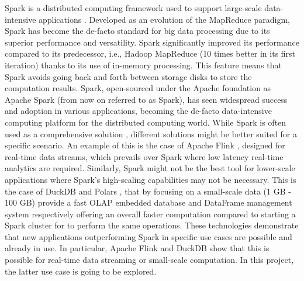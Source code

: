 Spark is a distributed computing framework used to support large-scale data-intensive applications \cite{zaharia2010spark}. Developed as an evolution of the MapReduce paradigm, Spark has become the de-facto standard for big data processing due to its superior performance and versatility. Spark significantly improved its performance compared to its predecessor, i.e., Hadoop MapReduce (10 times better in its first iteration) \cite{zaharia2010spark} thanks to its use of in-memory processing. This feature means that Spark avoids going back and forth between storage disks to store the computation results. Spark, open-sourced under the Apache foundation as Apache Spark (from now on referred to as Spark), has seen widespread success and adoption in various applications, becoming the de-facto data-intensive computing platform for the distributed computing world. While Spark is often used as a comprehensive solution \cite{zahariaApacheSparkUnified2016}, different solutions might be better suited for a specific scenario.
An example of this is the case of Apache Flink \cite{carboneApacheFlinkStream}, designed for real-time data streams, which prevails over Spark where low latency real-time analytics are required. Similarly, Spark might not be the best tool for lower-scale applications where Spark's high-scaling capabilities may not be necessary. This is the case of DuckDB \cite{raasveldtDuckDBEmbeddableAnalytical2019} and Polars \cite{vinkWroteOneFastest2021}, that by focusing on a small-scale data (1 GB - 100 GB) provide a fast \gls{OLAP} embedded database and DataFrame management system respectively offering an overall faster computation compared to starting a Spark cluster for to perform the same operations. These technologies demonstrate that new applications outperforming Spark in specific use cases are possible and already in use. In particular, Apache Flink and DuckDB show that this is possible for real-time data streaming or small-scale computation. In this project, the latter use case is going to be explored.

